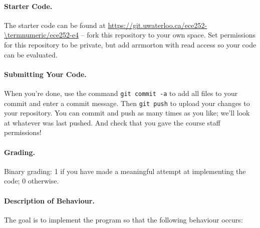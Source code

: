 \paragraph{Starter Code.} The starter code can be found at \url{https://git.uwaterloo.ca/ece252-\termnumeric/ece252-e4} -- fork this repository to your own space. Set permissions for this repository to be private, but add arrmorton with read access so your code can be evaluated.

\paragraph{Submitting Your Code.} When you're done, use the command \texttt{git commit -a} to add all files to your commit and enter a commit message. Then \texttt{git push} to upload your changes to your repository. You can commit and push as many times as you like; we'll look at whatever was last pushed. And check that you gave the course staff permissions!

\paragraph{Grading.} Binary grading: 1 if you have made a meaningful attempt at implementing the code; 0 otherwise.

\paragraph{Description of Behaviour.} The goal is to implement the program so that the following behaviour occurs:

